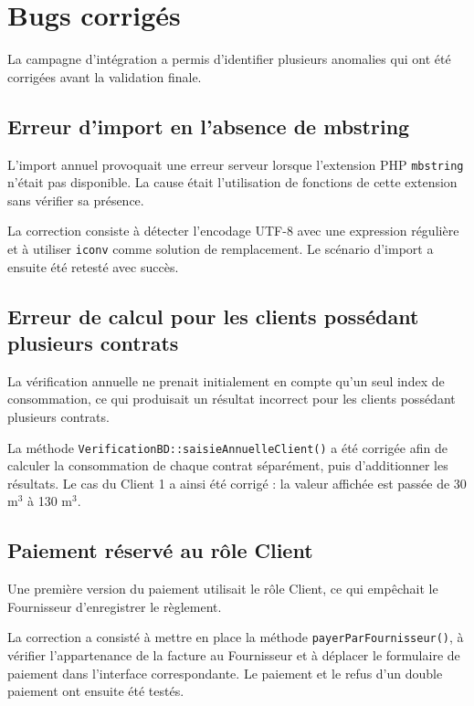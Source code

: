 \section{Bugs corrigés}

La campagne d'intégration a permis d'identifier plusieurs anomalies qui ont été corrigées avant la validation finale.

\subsection{Erreur d'import en l'absence de mbstring}

L'import annuel provoquait une erreur serveur lorsque l'extension PHP \texttt{mbstring} n'était pas disponible. La cause était l'utilisation de fonctions de cette extension sans vérifier sa présence.

La correction consiste à détecter l'encodage UTF-8 avec une expression régulière et à utiliser \texttt{iconv} comme solution de remplacement. Le scénario d'import a ensuite été retesté avec succès.

\subsection{Erreur de calcul pour les clients possédant plusieurs contrats}

La vérification annuelle ne prenait initialement en compte qu'un seul index de consommation, ce qui produisait un résultat incorrect pour les clients possédant plusieurs contrats.

La méthode \texttt{VerificationBD::saisieAnnuelleClient()} a été corrigée afin de calculer la consommation de chaque contrat séparément, puis d'additionner les résultats. Le cas du Client 1 a ainsi été corrigé : la valeur affichée est passée de 30 m$^3$ à 130 m$^3$.

\subsection{Paiement réservé au rôle Client}

Une première version du paiement utilisait le rôle Client, ce qui empêchait le Fournisseur d'enregistrer le règlement.

La correction a consisté à mettre en place la méthode \texttt{payerParFournisseur()}, à vérifier l'appartenance de la facture au Fournisseur et à déplacer le formulaire de paiement dans l'interface correspondante. Le paiement et le refus d'un double paiement ont ensuite été testés.

